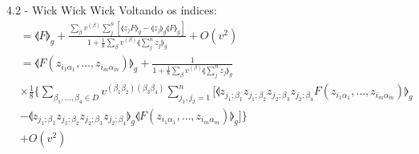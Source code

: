 \documentclass{beamer}
\begin{document}
\begin{frame}{4.2 - Wick Wick Wick}
    Voltando os índices:
    \tiny
    \begin{align*}
        &=\llangle 
            F
        \rrangle_g  
        +
        \frac{
            \sum_{\beta}v^{(\beta)}\sum_{j}^n \left[\llangle
                z_{j}
                F
            \rrangle_g
            -
            \llangle
                z_{j}
            \rrangle_g
            \llangle
                F
            \rrangle_g\right]
        }{
            1 + \frac{1}{8} \sum_{\beta}v^{(\beta)}
            \llangle
            \sum_{j}^n z_{j}
            \rrangle_g
        }  
        + O(v^2) \\
        &=\llangle
            F(z_{i_1\alpha_1},\dots,z_{i_m\alpha_m})
        \rrangle_g  
        +
        \frac{
            1
        }{
            1 + \frac{1}{8} \sum_{\beta}v^{(\beta)}
            \llangle
            \sum_{j}^n z_{j}
            \rrangle_g
        }  \\
        & \times \frac{1}{8} \{
         \sum_{\beta_1,\dots,\beta_4 \in D}v^{(\beta_1\beta_2)(\beta_3\beta_4)} \sum_{j_1,j_2=1}^n[\llangle
            z_{j_1;\beta_1}z_{j_1;\beta_2}z_{j_2;\beta_3}z_{j_2;\beta_4}
            F(z_{i_1\alpha_1},\dots,z_{i_m\alpha_m})
        \rrangle_g \\
        & - \llangle
            z_{j_1;\beta_1}z_{j_1;\beta_2}z_{j_2;\beta_3}z_{j_2;\beta_4}
        \rrangle_g
        \llangle
            F(z_{i_1\alpha_1},\dots,z_{i_m\alpha_m})
        \rrangle_g]
        \}\\
        & + O(v^2) \\
    \end{align*}
\end{frame}
\end{document}
